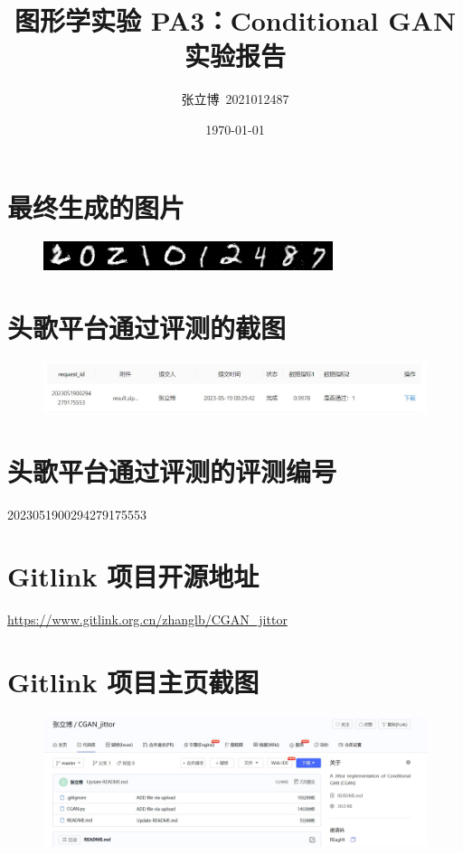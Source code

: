 \documentclass[12pt,a4paper]{article}
\title{\textbf{图形学实验 PA3：Conditional GAN 实验报告}}
\author{张立博\ 2021012487}
\date{\today}
\begin{document}
\maketitle
\section{最终生成的图片}
\begin{figure}[H]
    \centering
    \includegraphics*{result.png}
\end{figure}
\section{头歌平台通过评测的截图}
\begin{figure}[H]
    \centering
    \includegraphics*{evaluate.jpg}
\end{figure}
\section{头歌平台通过评测的评测编号}
2023051900294279175553
\section{Gitlink 项目开源地址}
\url{https://www.gitlink.org.cn/zhanglb/CGAN_jittor}
\section{Gitlink 项目主页截图}
\begin{figure}[H]
    \centering
    \includegraphics*[scale = 0.5]{gitlink.jpg}
\end{figure}
\end{document}
